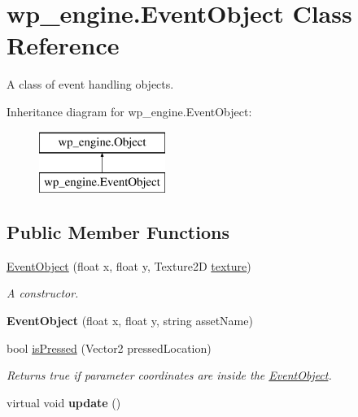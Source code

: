 \hypertarget{classwp__engine_1_1_event_object}{\section{wp\-\_\-engine.\-Event\-Object Class Reference}
\label{classwp__engine_1_1_event_object}
}


A class of event handling objects.  


Inheritance diagram for wp\-\_\-engine.\-Event\-Object\-:\begin{figure}[H]
\begin{center}
\leavevmode
\includegraphics[height=2.000000cm]{classwp__engine_1_1_event_object}
\end{center}
\end{figure}
\subsection*{Public Member Functions}
\begin{DoxyCompactItemize}
\item 
\hyperlink{classwp__engine_1_1_event_object_a3e38dc176c260f8f642042a0e3754553}{Event\-Object} (float x, float y, Texture2\-D \hyperlink{classwp__engine_1_1_object_a5aebe29df25c51280d462cab63733c98}{texture})
\begin{DoxyCompactList}\small\item\em A constructor. \end{DoxyCompactList}\item 
\hypertarget{classwp__engine_1_1_event_object_a3abb3c66c76000c0d4d60ea55d024f13}{{\bfseries Event\-Object} (float x, float y, string asset\-Name)}\label{classwp__engine_1_1_event_object_a3abb3c66c76000c0d4d60ea55d024f13}

\item 
bool \hyperlink{classwp__engine_1_1_event_object_a32c433ab84ba60ca864f0dd9143fa339}{is\-Pressed} (Vector2 pressed\-Location)
\begin{DoxyCompactList}\small\item\em Returns true if parameter coordinates are inside the \hyperlink{classwp__engine_1_1_event_object}{Event\-Object}. \end{DoxyCompactList}\item 
\hypertarget{classwp__engine_1_1_event_object_a7a08fb371abceda36198f96b853fafea}{virtual void {\bfseries update} ()}\label{classwp__engine_1_1_event_object_a7a08fb371abceda36198f96b853fafea}

\end{DoxyCompactItemize}
